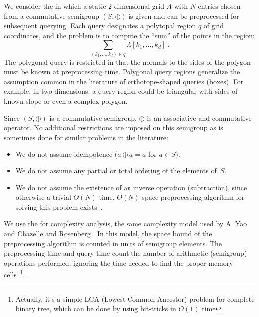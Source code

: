 
We consider the  in which a static
$2$-dimensional grid $A$ with $N$ entries chosen from a
commutative semigroup $(S, \oplus)$ is given and can be preprocessed
for subsequent querying.  Each query designates a polytopal region $q$
of grid coordinates, and the problem is to compute the ``sum'' of the
points in the region:
%
\begin{equation} 
\sum_{(k_1,\ldots,k_d) \in q} A[k_1,\ldots,k_d]\ .
\label{eq:defIrregularRangeQuery}
\end{equation}
The polygonal query is restricted in that the normals to the sides
of the polygon must be known at
preprocessing time.  Polygonal query regions generalize the assumption
common in the literature of orthotope-shaped queries (boxes).  For
example, in two dimensions, a query region could be triangular with
sides of known slope or even a complex polygon.

Since $(S, \oplus)$ is a commutative semigroup, $\oplus$ is an
associative and commutative operator.  No additional restrictions are
imposed on this semigroup as is sometimes done for similar problems in
the literature:
\begin{itemize}

\item We do not assume idempotence ($a \oplus a = a$ for $a \in S$).

\item We do not assume any partial or total ordering of the elements
  of~$S$.

\item We do not assume the existence of an inverse operation
  (subtraction), since otherwise a trivial $\Theta(N)$-time,
  $\Theta(N)$-space preprocessing algorithm for solving this problem
  exists~\cite{Yao82}.
\end{itemize} 

We use the  for complexity analysis, the same
complexity model used by A. Yao \cite{Yao82, Yao85} and Chazelle and
Rosenberg \cite{ChazelleRo89, ChazelleRo91}.  In this model, the space
bound of the preprocessing algorithm is counted in units of semigroup
elements.  The preprocessing time and query time count the number of
arithmetic (semigroup) operations performed, ignoring the time needed
to find the proper memory cells~\cite{Yao82}\footnote{Actually, it's
a simple LCA (Lowest Common Ancestor) problem for complete binary tree, 
which can be done by using bit-tricks in $O(1)$ time}.

